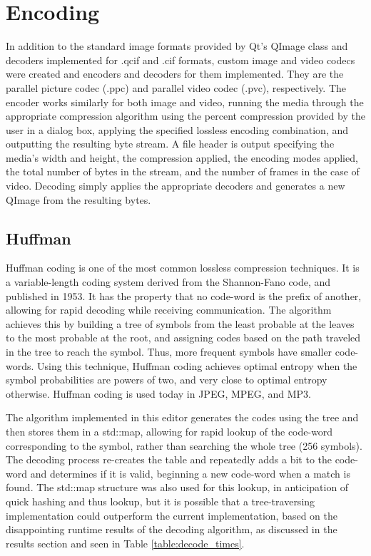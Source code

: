 \documentclass[10pt,twocolumn,twoside]{IEEEtran}
\begin{document}
\section{Encoding}
In addition to the standard image formats provided by Qt's QImage class and decoders implemented for .qcif and .cif formats, custom image and video codecs were created and encoders and decoders for them implemented. They are the parallel picture codec (.ppc) and parallel video codec (.pvc), respectively. The encoder works similarly for both image and video, running the media through the appropriate compression algorithm using the percent compression provided by the user in a dialog box, applying the specified lossless encoding combination, and outputting the resulting byte stream. A file header is output specifying the media's width and height, the compression applied, the encoding modes applied, the total number of bytes in the stream, and the number of frames in the case of video. Decoding simply applies the appropriate decoders and generates a new QImage from the resulting bytes.

\subsection{Huffman}
Huffman coding is one of the most common lossless compression techniques. It is a variable-length coding system derived from the Shannon-Fano code, and published in 1953. It has the property that no code-word is the prefix of another, allowing for rapid decoding while receiving communication. The algorithm achieves this by building a tree of symbols from the least probable at the leaves to the most probable at the root, and assigning codes based on the path traveled in the tree to reach the symbol. Thus, more frequent symbols have smaller code-words. Using this technique, Huffman coding achieves optimal entropy when the symbol probabilities are powers of two, and very close to optimal entropy otherwise. Huffman coding is used today in JPEG, MPEG, and MP3.

The algorithm implemented in this editor generates the codes using the tree and then stores them in a std::map, allowing for rapid lookup of the code-word corresponding to the symbol, rather than searching the whole tree (256 symbols). The decoding process re-creates the table and repeatedly adds a bit to the code-word and determines if it is valid, beginning a new code-word when a match is found. The std::map structure was also used for this lookup, in anticipation of quick hashing and thus lookup, but it is possible that a tree-traversing implementation could outperform the current implementation, based on the disappointing runtime results of the decoding algorithm, as discussed in the results section and seen in Table \ref{table:decode_times}.
\end{document}
